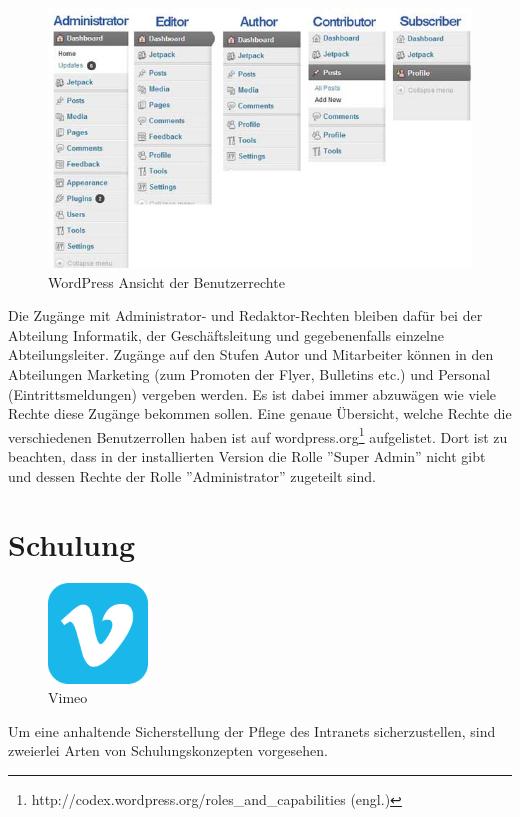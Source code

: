\documentclass[a4paper,11pt,twoside,titlepage,openright]{report}
\numberwithin{equation}{section}		%
\numberwithin{figure}{section}			%
\numberwithin{table}{section}				%
\begin{document}
\begin{figure}[H]
\centering
\vspace{+20px}
\includegraphics[width=\textwidth]{Images/userroles.jpg}
\caption{WordPress Ansicht der Benutzerrechte}
\end{figure}

Die Zugänge mit Administrator- und Redaktor-Rechten bleiben dafür bei der Abteilung Informatik, der Geschäftsleitung und gegebenenfalls einzelne Abteilungsleiter. Zugänge auf den Stufen Autor und  Mitarbeiter können in den Abteilungen Marketing (zum Promoten der Flyer, Bulletins etc.) und Personal (Eintrittsmeldungen) vergeben werden. Es ist dabei immer abzuwägen wie viele Rechte diese Zugänge bekommen sollen. Eine genaue Übersicht, welche Rechte die verschiedenen Benutzerrollen haben ist auf wordpress.org\footnote{http://codex.wordpress.org/roles\_and\_capabilities (engl.)} aufgelistet. Dort ist zu beachten, dass in der installierten Version die Rolle ''Super Admin'' nicht gibt und dessen Rechte der Rolle ''Administrator'' zugeteilt sind.

\section{Schulung}

\begin{figure}
\centering
\includegraphics[width=100px]{Images/vimeo.png}
\caption{Vimeo}
\end{figure}
Um eine anhaltende Sicherstellung der Pflege des Intranets sicherzustellen, sind zweierlei Arten von Schulungskonzepten vorgesehen.
\end{document}
